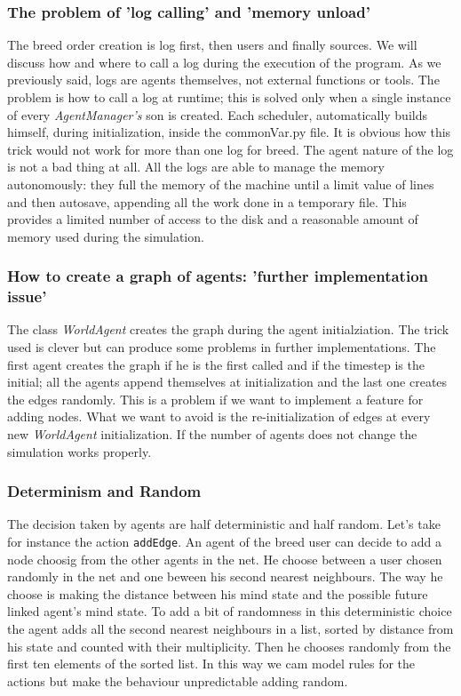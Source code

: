 \subsubsection{The problem of 'log calling' and 'memory unload'}
The breed order creation is log first, then users and finally sources.
We will discuss how and where to call a log during the execution of the program.
As we previously said, logs are agents themselves, not external functions
or tools. The problem is how to call a log at runtime; this is solved
only when a single instance of every \textit{AgentManager's} son is
created. Each scheduler, automatically builds himself, during
initialization, inside the commonVar.py file. It is obvious how this trick
would not work for more than one log for breed.
The agent nature of the log is not a bad thing at all. All the logs are
able to manage the memory autonomously: they full the memory of the machine
until a limit value of lines and then autosave, appending all the work done
in a temporary file. This provides a limited number of access to the disk and
a reasonable amount of memory used during the simulation.

\subsubsection{How to create a graph of agents:
  'further implementation issue'}
The class \textit{WorldAgent} creates the graph during the agent
initialziation. The trick used is clever but can produce some
problems in further implementations. The first agent creates the graph
if he is the first called and if the timestep is the initial; all the
agents append themselves at initialization and the last one creates the edges
randomly. This is a problem if we want to implement a feature for adding nodes.
What we want to avoid is the re-initialization of edges at every new
\textit{WorldAgent} initialization. If the number of agents does not change the
simulation works properly.

\subsubsection{Determinism and Random}
The decision taken by agents are half deterministic and half random.
Let's take for instance the action \texttt{addEdge}.
An agent of the breed user can decide to add a node choosig from the
other agents in the net.
He choose between a user chosen randomly in the net and one beween
his second nearest neighbours.
The way he choose is making the distance between his mind state and the
possible future linked agent's mind state. To add a bit of randomness
in this deterministic choice the agent adds all the second nearest
neighbours in a list, sorted by distance from his state and counted
with their multiplicity. Then he chooses randomly from the first ten
elements of the sorted list. In this way we cam model rules for the
actions but make the behaviour unpredictable adding random.

